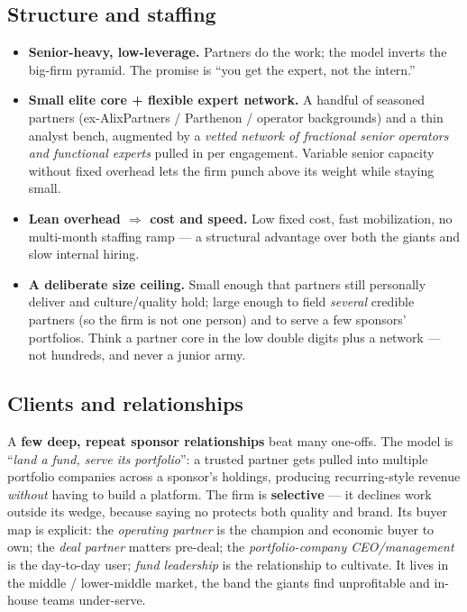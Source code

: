 \documentclass[11pt]{article}
\begin{document}
\subsection{Structure and staffing}
\begin{itemize}
  \item \textbf{Senior-heavy, low-leverage.} Partners do the work; the model inverts the
  big-firm pyramid. The promise is ``you get the expert, not the intern.''
  \item \textbf{Small elite core + flexible expert network.} A handful of seasoned partners
  (ex-AlixPartners / Parthenon / operator backgrounds) and a thin analyst bench, augmented
  by a \emph{vetted network of fractional senior operators and functional experts} pulled in
  per engagement. Variable senior capacity without fixed overhead lets the firm punch above
  its weight while staying small.
  \item \textbf{Lean overhead $\Rightarrow$ cost and speed.} Low fixed cost, fast
  mobilization, no multi-month staffing ramp --- a structural advantage over both the giants
  and slow internal hiring.
  \item \textbf{A deliberate size ceiling.} Small enough that partners still personally
  deliver and culture/quality hold; large enough to field \emph{several} credible partners
  (so the firm is not one person) and to serve a few sponsors' portfolios. Think a partner
  core in the low double digits plus a network --- not hundreds, and never a junior army.
\end{itemize}

\subsection{Clients and relationships}
A \textbf{few deep, repeat sponsor relationships} beat many one-offs. The model is
``\emph{land a fund, serve its portfolio}'': a trusted partner gets pulled into multiple
portfolio companies across a sponsor's holdings, producing recurring-style revenue
\emph{without} having to build a platform. The firm is \textbf{selective} --- it declines
work outside its wedge, because saying no protects both quality and brand. Its buyer map is
explicit: the \emph{operating partner} is the champion and economic buyer to own; the
\emph{deal partner} matters pre-deal; the \emph{portfolio-company CEO/management} is the
day-to-day user; \emph{fund leadership} is the relationship to cultivate. It lives in the
middle / lower-middle market, the band the giants find unprofitable and in-house teams
under-serve.
\end{document}
